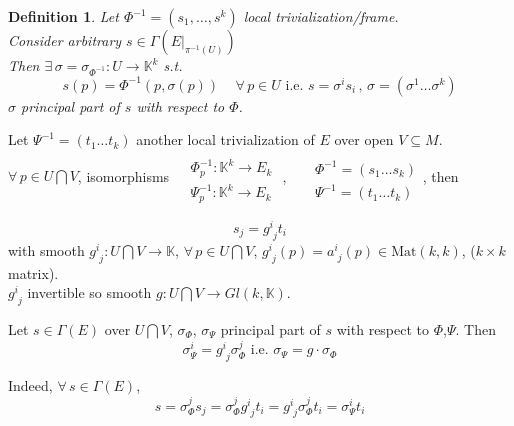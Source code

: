 \documentclass[10pt]{amsart}
\newtheorem{definition}{Definition}
\begin{document}
\begin{multicols*}{2}
\begin{definition}
Let $\Phi^{-1} = (s_1,\dots, s^k)$ local trivialization/frame. \\
Consider arbitrary $s \in \Gamma( \left. E \right|_{\pi^{-1}(U) })$  \\
Then $\exists \, \sigma = \sigma_{\Phi^{-1} }: U \to \mathbb{K}^k$ s.t.
\[
s(p) = \Phi^{-1}(p,\sigma(p)) \quad \, \forall \, p \in U \text{ i.e. } s = \sigma^i s_i \, , \,  \sigma = (\sigma^1 \dots \sigma^k)
\] 
$\sigma$ \emph{principal part of $s$ with respect to $\Phi$}.
\end{definition}

Let $\Psi^{-1} = (t_1 \dots t_k)$ another local trivialization of $E$ over open $V \subseteq M$.  \\
\phantom{Let } $\forall \, p \in U \bigcap V$, isomorphisms $\begin{aligned} & \quad \\
  & \Phi_p^{-1} : \mathbb{K}^k \to E_k \\
  & \Psi_p^{-1} : \mathbb{K}^k \to E_k  \end{aligned}$ , \quad \, $\begin{aligned} & \quad \\
  & \Phi^{-1} = (s_1 \dots s_k) \\
  & \Psi^{-1} = (t_1 \dots t_k) \end{aligned}$, then 

\[
s_j = g^i_{ \,\, j} t_i 
\]
with smooth $g^i_{ \,\, j} : U \bigcap V \to \mathbb{K}$, $\forall \, p \in U \bigcap V$, $g^i_{ \,\, j}(p) = a^i_{ \, \, j}(p) \in \text{Mat}(k,k)$, ($k\times k$ matrix).  \\
\phantom{ with } $g^i_{ \,\, j}$ invertible so smooth $g:U\bigcap V \to Gl(k,\mathbb{K})$.

Let $s\in \Gamma(E)$ over $U\bigcap V$, $\sigma_{\Phi}$, $\sigma_{\Psi}$ principal part of $s$ with respect to $\Phi$,$\Psi$.  Then
\[
\sigma^i_{\Psi} = g^i_{ \,\, j} \sigma^j_{\Phi} \text{ i.e. } \sigma_{\Psi} = g\cdot \sigma_{\Phi}
\]

Indeed, $\forall \, s \in \Gamma(E)$,
\[
s = \sigma^j_{\Phi} s_j = \sigma^j_{\Phi} g^i_{ \,\, j} t_i = g^i_{ \,\, j} \sigma^j_{ \Phi } t_i = \sigma^i_{\Psi } t_i
\]






\end{multicols*}
\end{document}
